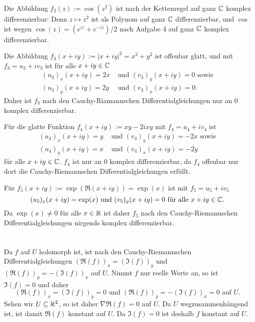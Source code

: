 \documentclass[a4paper,10pt]{article}
\begin{document}
Die Abbildung $f_2(z) := \cos(z^2)$ ist nach der Kettenregel auf ganz $\mathbb{C}$ komplex differenzierbar: Denn $z \mapsto z^2$ ist als Polynom auf ganz $\mathbb{C}$ differenzierbar, und $\cos$ ist wegen $\cos(z) = (e^{iz}+e^{-iz})/2$ nach Aufgabe 4 auf ganz $\mathbb{C}$ komplex differenzierbar.


Die Abbildung $f_3(x+iy) := |x+iy|^2 = x^2 + y^2$ ist offenbar glatt, und mit $f_3 = u_3+iv_3$ ist für alle $x+iy \in \mathbb{C}$
\begin{align*}
 (u_3)_x(x+iy) = 2x &\text{ und } (v_3)_y(x+iy) = 0 \text{ sowie} \\
 (u_3)_y(x+iy) = 2y &\text{ und } (v_3)_x(x+iy) = 0.
\end{align*}
Daher ist $f_3$ nach den Cauchy-Riamannschen Differentialgleichungen nur an $0$ komplex differenzierbar.


Für die glatte Funktion $f_4(x+iy) := xy-2ixy$ mit $f_4 = u_4+iv_4$ ist
\begin{align*}
 (u_4)_x(x+iy) = y &\text{ und } (v_4)_y(x+iy) = -2x \text{ sowie} \\
 (u_4)_y(x+iy) = x &\text{ und } (v_4)_x(x+iy) = -2y
\end{align*}
für alle $x+iy \in \mathbb{C}$. $f_4$ ist nur an $0$ komplex differenzierbar, da $f_4$ offenbar nur dort die Cauchy-Riemannschen Differentialgleichungen erfüllt.


Für $f_5(x+iy) := \exp(\Re(x+iy)) = \exp(x)$ ist mit $f_5 = u_5+iv_5$
\[
 (u_5)_x(x+iy) = \exp(x) \text{ und } (v_5)_y(x+iy) = 0 \text{ für alle } x+iy \in \mathbb{C}.
\]
Da $\exp(x) \neq 0$ für alle $x \in \mathbb{R}$ ist daher $f_5$ nach den Cauchy-Riemannschen Differentialgleichungen nirgends komplex differenzierbar.








\section{}


\addtocounter{subsection}{1}
\subsection{}
Da $f$ auf $U$ holomorph ist, ist nach den Cauchy-Riemannschen Differentialgleichungen $(\Re(f))_x = (\Im(f))_y$ und $(\Re(f))_y = -(\Im(f))_x$ auf $U$. Nimmt $f$ nur reelle Werte an, so ist $\Im(f) = 0$ und daher
\[
 (\Re(f))_x = (\Im(f))_y = 0 \text{ und } (\Re(f))_y = -(\Im(f))_x = 0 \text{ auf } U.
\]
Sehen wir $U \subseteq \mathbb{R}^2$, so ist daher $\nabla \Re(f) = 0$ auf $U$. Da $U$ wegzusammenhängend ist, ist damit $\Re(f)$ konstant auf $U$. Da $\Im(f) = 0$ ist deshalb $f$ konstant auf $U$.
\end{document}
